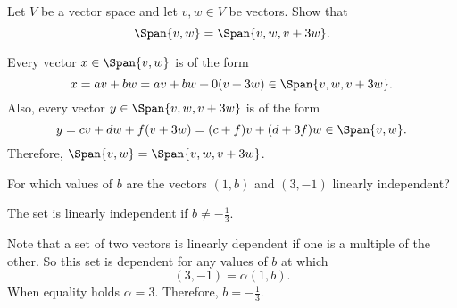 \documentclass{article}
\begin{document}



\problemlabel

\begin{exercise} \label{c5.2.8b}
Let $V$ be a vector space and let $v,w\in V$ be vectors.  Show that
\[
\Span\{v,w\}=\Span\{v,w,v+3w\}.
\]

\begin{solution}
Every vector $x \in \Span\{v,w\}$ is of the form 
\[
x = av + bw = av + bw + 0(v + 3w) \in \Span\{v,w,v+3w\}.
\]
  Also, every vector $y \in \Span\{v,w,v+3w\}$ is of the form
\[
y = cv + dw + f(v + 3w) = (c + f)v + (d + 3f)w \in \Span\{v,w\}.
\]
Therefore, $\Span\{v,w\} = \Span\{v,w,v+3w\}$.

\end{solution}
\end{exercise}



\newpage

\problemlabel

\begin{exercise} \label{c5.4.2}
For which values of $b$ are the vectors $(1,b)$ and $(3,-1)$
linearly independent?

\begin{solution}

\ans The set is linearly independent if $b \neq -\frac{1}{3}$.

\soln Note that a set of two vectors is linearly dependent if one is
a multiple of the other.  So this set is dependent for any values of
$b$ at which
\[
(3,-1) = \alpha(1,b).
\]
When equality holds $\alpha = 3$.  Therefore, $b = -\frac{1}{3}$.  

\end{solution}
\end{exercise}





\problemlabel
\end{document}
